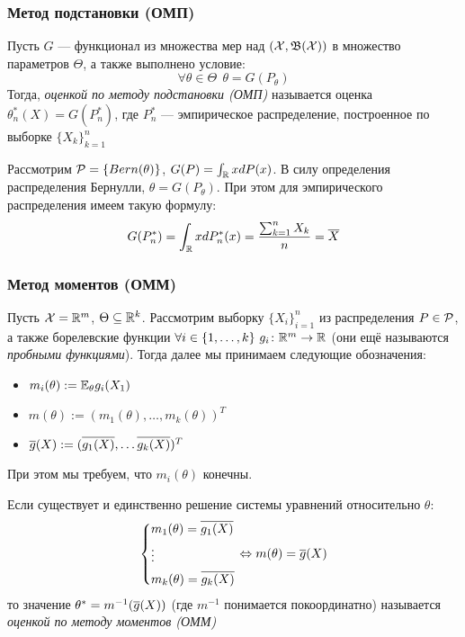 \subsubsection*{Метод подстановки (ОМП)}

\begin{definition}
	Пусть $G$ --- функционал из множества мер над $(\mathcal{X}, \mathfrak{B}(\mathcal{X}))$ в множество параметров $\Theta$, а также выполнено условие:
	\[
		\forall \theta \in \Theta\ \ \theta = G(P_\theta)
	\]
	Тогда, \textit{оценкой по методу подстановки (ОМП)} называется оценка $\theta_n^*(X) = G(P_n^*)$, где $P_n^*$ --- эмпирическое распределение, построенное по выборке $\{X_k\}_{k = 1}^n$
\end{definition}

\begin{example}
	Рассмотрим $\mathcal{P} = \{Bern(\theta)\}$, $G(P) = \int_{\mathbb{R}} xdP(x)$. В силу определения распределения Бернулли, $\theta = G(P_\theta)$. При этом для эмпирического распределения имеем такую формулу:
	\[
		G(P_n^*) = \int_{\mathbb{R}} xdP_n^*(x) = \frac{\sum_{k = 1}^n X_k}{n} = \overline{X}
	\]
\end{example}

\subsubsection*{Метод моментов (ОММ)}

\begin{note}
	Пусть $\mathcal{X} = \mathbb{R}^m$, $\Theta \subseteq \mathbb{R}^k$. Рассмотрим выборку $\{X_i\}_{i = 1}^n$ из распределения $P \in \mathcal{P}$, а также борелевские функции $\forall i \in \{1, \ldots, k\}\ g_i \colon \mathbb{R}^m \to \mathbb{R}$ (они ещё называются \textit{пробными функциями}). Тогда далее мы принимаем следующие обозначения:
	\begin{itemize}
		\item $m_i(\theta) := \mathbb{E}_\theta g_i(X_1)$
		
		\item $m(\theta) := (m_1(\theta), \ldots, m_k(\theta))^T$
		
		\item $\overline{g}(X) := (\overline{g_1(X)}, \ldots \overline{g_k(X)})^T$
	\end{itemize}
	При этом мы требуем, что $m_i(\theta)$ конечны.
\end{note}

\begin{definition}
	Если существует и единственно решение системы уравнений относительно $\theta$:
	\[
		\left\{\begin{aligned}
			&{m_1(\theta) = \overline{g_1(X)}}
			\\
			&{\vdots}
			\\
			&{m_k(\theta) = \overline{g_k(X)}}
		\end{aligned}\right.
		\Leftrightarrow m(\theta) = \overline{g}(X)
	\]
	то значение $\theta^* = m^{-1}(\overline{g}(X))$ (где $m^{-1}$ понимается покоординатно) называется \textit{оценкой по методу моментов (ОММ)}
\end{definition}

